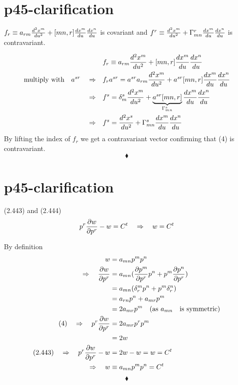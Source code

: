\section{p45-clarification }
\begin{tcolorbox}
$ f_r \equiv a_{rm}\dv[2]{x^m}{u} +[mn,r]\dv{x^m}{u}\dv{x^n}{u}$ is covariant and 
$ f^r \equiv \dv[2]{x^m}{u} +\Gamma^r_{mn}\dv{x^m}{u}\dv{x^n}{u}$ is contravariant.
\end{tcolorbox}
\begin{align}
\ &f_r \equiv a_{rm}\dv[2]{x^m}{u} +[mn,r]\dv{x^m}{u}\dv{x^n}{u}\\
\text{multiply with}\quad a^{sr}\quad \Rightarrow\quad &f_r a^{sr} = a^{sr}a_{rm}\dv[2]{x^m}{u} +a^{sr}[mn,r]\dv{x^m}{u}\dv{x^n}{u}\\
\Rightarrow\quad &f^{s} = \delta^s_m \dv[2]{x^m}{u} +\underbrace{a^{sr}[mn,r]}_{\Gamma^s_{mn}}\dv{x^m}{u}\dv{x^n}{u}\\
\Rightarrow \quad &f^{s} = \dv[2]{x^s}{u} +\Gamma^s_{mn}\dv{x^m}{u}\dv{x^n}{u}
\end{align}
By lifting the index of $f_r$ we get a contravariant vector confirming that (4) is contravariant.
$$\blacklozenge$$
\newpage

\section{p45-clarification }
\begin{tcolorbox}
(2.443) and (2.444)
$$ p^r\pdv{w}{p^r} - w = C^t \quad \Rightarrow\quad w = C^t $$ 
\end{tcolorbox}
By definition 
\begin{align}
\ w &= a_{mn}p^mp^n\\
\Rightarrow\quad \pdv{w}{p^r} &= a_{mn}(\pdv{p^m}{p^r}p^n + p^m \pdv{p^n}{p^r})\\
\ &= a_{mn}(\delta^m_rp^n + p^m \delta^n_r)\\
\ &= a_{rn}p^n + a_{mr}p^m \\
\ &= 2a_{mr}p^m \quad\text{(as } a_{mn} \quad \text{is symmetric)}\\
\text{(4)}\quad \Rightarrow \quad p^r\pdv{w}{p^r} &= 2a_{mr}p^rp^m \\
\ &= 2w\\
\text{(2.443)} \quad\Rightarrow\quad p^r\pdv{w}{p^r} -w &= 2w-w = w = C^t\\
\Rightarrow\quad w &\equiv a_{mn}p^mp^n = C^t
\end{align}
$$\blacklozenge$$
\newpage


